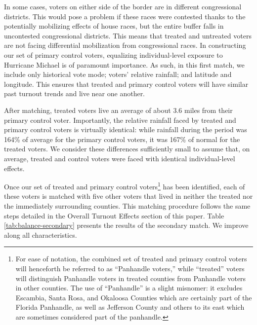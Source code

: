 \documentclass[
  12pt,
]{article}
\begin{document}
In some cases, voters on either side of the border are in different congressional districts. This would pose a problem if these races were contested thanks to the potentially mobilizing effects of house races, but the entire buffer falls in uncontested congressional districts. This means that treated and untreated voters are not facing differential mobilization from congressional races. In constructing our set of primary control voters, equalizing individual-level exposure to Hurricane Michael is of paramount importance. As such, in this first match, we include only historical vote mode; voters' relative rainfall; and latitude and longitude. This ensures that treated and primary control voters will have similar past turnout trends and live near one another.

After matching, treated voters live an average of about 3.6 miles from their primary control voter. Importantly, the relative rainfall faced by treated and primary control voters is virtually identical: while rainfall during the period was 164\% of average for the primary control voters, it was 167\% of normal for the treated voters. We consider these differences sufficiently small to assume that, on average, treated and control voters were faced with identical individual-level effects.

Once our set of treated and primary control voters\footnote{For ease of notation, the combined set of treated and primary control voters will henceforth be referred to as ``Panhandle voters,'' while ``treated'' voters will distinguish Panhandle voters in treated counties from Panhandle voters in other counties. The use of ``Panhandle'' is a slight misnomer: it excludes Escambia, Santa Rosa, and Okaloosa Counties which are certainly part of the Florida Panhandle, as well as Jefferson County and others to its east which are sometimes considered part of the panhandle.} has been identified, each of these voters is matched with five other voters that lived in neither the treated nor the immediately surrounding counties. This matching procedure follows the same steps detailed in the Overall Turnout Effects section of this paper. Table \ref{tab:balance-secondary} presents the results of the secondary match. We improve along all characteristics.
\end{document}
